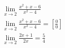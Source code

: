 \begin{ex}
\begin{align}
&\lim_{x\rightarrow 2} \frac{x^2+x-6}{x^2-4}\nonumber\\
&\lim_{x\rightarrow 2} \frac{x^2+x-6}{x^2-4} = \left[\frac{0}{0}\right]\nonumber\\
&\lim_{x\rightarrow 2} \frac{2x+1}{2x}=\frac{5}{4}\nonumber
\end{align}
\end{ex}